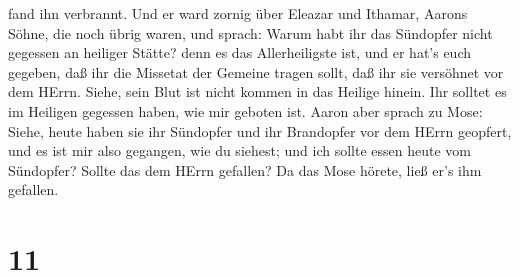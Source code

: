 fand ihn verbrannt. Und er ward zornig über Eleazar und Ithamar, Aarons
Söhne, die noch übrig waren, und sprach:  Warum habt ihr
das Sündopfer nicht gegessen an heiliger Stätte? denn es das
Allerheiligste ist, und er hat's euch gegeben, daß ihr die Missetat der
Gemeine tragen sollt, daß ihr sie versöhnet vor dem HErrn. 
Siehe, sein Blut ist nicht kommen in das Heilige hinein. Ihr solltet es
im Heiligen gegessen haben, wie mir geboten ist.  Aaron
aber sprach zu Mose: Siehe, heute haben sie ihr Sündopfer und ihr
Brandopfer vor dem HErrn geopfert, und es ist mir also gegangen, wie du
siehest; und ich sollte essen heute vom Sündopfer? Sollte das dem HErrn
gefallen?  Da das Mose hörete, ließ er's ihm gefallen.

\hypertarget{section-10}{%
\section{11}\label{section-10}}

